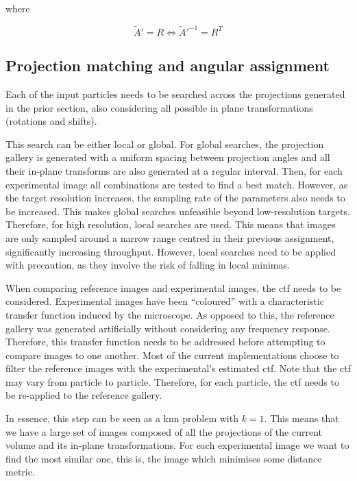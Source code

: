 \documentclass[../main.tex]{subfiles}
\begin{document}
where 

\begin{equation}\label{eq:3:projection_fourier_pose}
    \tilde{A}' = R \Leftrightarrow \tilde{A}'^{-1} = R^T
\end{equation}

\subsection{Projection matching and angular assignment}
Each of the input particles needs to be searched across the projections generated in the prior section, also considering all possible in plane transformations (rotations and shifts). 

This search can be either local or global. For global searches, the projection gallery is generated with a uniform spacing between projection angles and all their in-plane transforms are also generated at a regular interval. Then, for each experimental image all combinations are tested to find a best match. However, as the target resolution increases, the sampling rate of the parameters also needs to be increased. This makes global searches unfeasible beyond low-resolution targets. Therefore, for high resolution, local searches are used. This means that images are only sampled around a narrow range centred in their previous assignment, significantly increasing throughput\cite{cryosparc}\cite{scheres2021}. However, local searches need to be applied with precaution, as they involve the risk of falling in local minimas.

When comparing reference images and experimental images, the \gls{ctf} needs to be considered. Experimental images have been ``coloured'' with a characteristic transfer function induced by the microscope. As opposed to this, the reference gallery was generated artificially without considering any frequency response. Therefore, this transfer function needs to be addressed before attempting to compare images to one another. Most of the current implementations choose to filter the reference images with the experimental's estimated \gls{ctf}. Note that the \gls{ctf} may vary from particle to particle\cite{sorzano2017b}. Therefore, for each particle, the \gls{ctf} needs to be re-applied to the reference gallery.

In essence, this step can be seen as a \gls{knn}\cite{sorzano2021} problem with $k=1$. This means that we have a large set of images composed of all the projections of the current volume and its in-plane transformations. For each experimental image we want to find the most similar one, this is, the image which minimises some distance metric.
\end{document}
